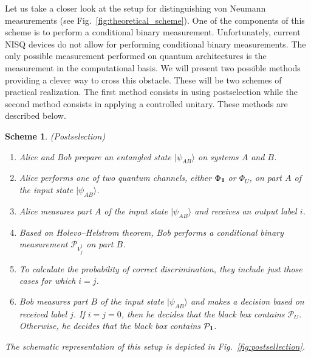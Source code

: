 \documentclass[preprint,12pt, a4paper]{elsarticle}
\newcommand{\ket}[1]{\ensuremath{|#1\rangle}}
\newcommand{\1}{{\rm 1\hspace{-0.9mm}l}}
\newcommand{\Id}{{\rm 1\hspace{-0.9mm}l}}
\newcommand{\PP}{\mathcal{P}}
\newtheorem{scheme}{Scheme}
\begin{document}
Let us take a closer look at the setup for distinguishing von Neumann 
measurements (see Fig.~\ref{fig:theoretical_scheme}). One of the components of 
this scheme is to perform a conditional binary measurement. 
Unfortunately, current NISQ devices do not allow for performing conditional 
binary measurements.
The only possible measurement performed on quantum architectures is the 
measurement in the computational basis. 
We  will present two possible methods providing a clever way to cross this 
obstacle. These will be two schemes of practical realization. 
The first method consists in using postselection while the second method 
consists in applying a controlled unitary. These methods are described below. 

\begin{scheme}(Postselection)









\begin{enumerate}
\item Alice and Bob prepare an entangled state $\ket{\psi_{AB}}$ on systems 
$A$ and $B$.
\item Alice performs one of two quantum channels, either $\Phi_{\Id}$ or 
$\Phi_{U}$,  on part $A$ of the input state  $\ket{\psi_{AB}}$.
\item Alice measures part $A$ of the input state  $\ket{\psi_{AB}}$ and 
receives an output label $i$.
\item  
Based on Holevo--Helstrom theorem, Bob performs a conditional binary 
measurement	$\PP_{V_j^\dagger}$ on part $B$.
\item To calculate the probability of correct discrimination, they include just those cases for which $i = j$.
\item Bob measures part $B$ of the input state  $\ket{\psi_{AB}}$ and makes a
decision based on received label $j$. If $i=j=0$, then he decides that the 
black box contains $\PP_U$. Otherwise, he decides that the black box contains
$\PP_{\Id}$.
\end{enumerate}


The schematic representation of this setup is depicted in 
Fig.~\ref{fig:postsellection}.     


\end{scheme}
\end{document}
